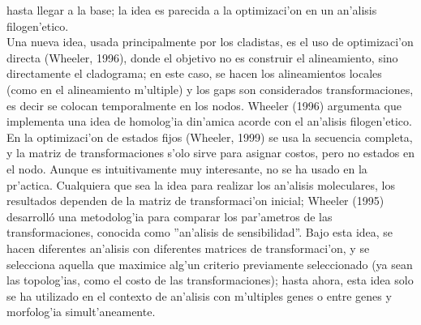 hasta llegar a la base; la idea es parecida a la optimizaci'on en un an'alisis filogen'etico.\\
Una nueva idea, usada principalmente por los cladistas, es el uso de optimizaci'on directa (Wheeler, 1996), donde el 
objetivo no es construir el alineamiento, sino directamente el cladograma; en este caso, se hacen los alineamientos locales 
(como en el alineamiento m'ultiple) y los gaps son considerados transformaciones, es decir se colocan temporalmente en 
los nodos. Wheeler (1996) argumenta que implementa una idea de homolog'ia din'amica acorde con el an'alisis filogen'etico. 
En la optimizaci'on de estados fijos (Wheeler, 1999) se usa la secuencia completa, y la matriz de transformaciones s'olo 
sirve para asignar costos, pero no estados en el nodo.  Aunque es intuitivamente muy 
interesante, no se ha usado en la pr'actica. Cualquiera que sea la idea para realizar los an'alisis moleculares, los 
resultados dependen de la matriz de transformaci'on inicial; Wheeler (1995) desarroll\'o una metodolog'ia para comparar 
los par'ametros de las transformaciones, conocida como ''an'alisis de sensibilidad''.
Bajo esta idea, se hacen diferentes an'alisis con diferentes matrices de transformaci'on, y se selecciona aquella que 
maximice alg'un criterio previamente seleccionado (ya sean las topolog'ias, como el costo de las transformaciones); hasta 
ahora, esta idea solo se ha utilizado en el contexto de an'alisis con m'ultiples genes o entre genes y morfolog'ia 
simult'aneamente.
